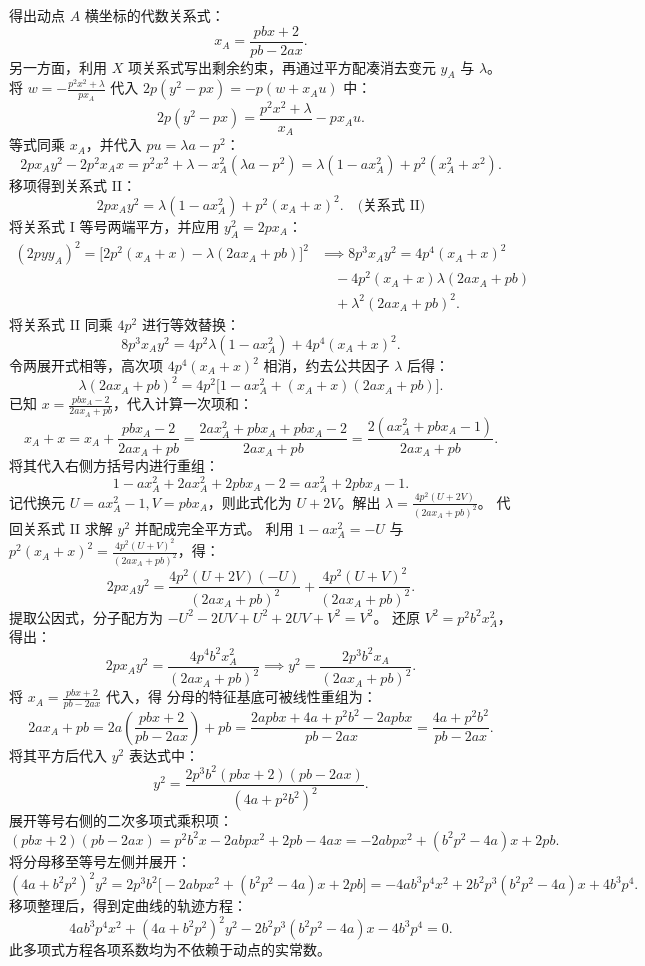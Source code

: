 \begin{solution}
得出动点 $A$ 横坐标的代数关系式：
\[ x_A = \frac{pbx + 2}{pb - 2ax}. \]
另一方面，利用 $X$ 项关系式写出剩余约束，再通过平方配凑消去变元 $y_A$ 与 $\lambda$。
将 $w = -\frac{p^2 x^2 + \lambda}{px_A}$ 代入 $2p(y^2 - px) = -p(w + x_A u)$ 中：
\[ 2p(y^2 - px) = \frac{p^2 x^2 + \lambda}{x_A} - px_A u. \]
等式同乘 $x_A$，并代入 $pu = \lambda a - p^2$：
\[ 2px_A y^2 - 2p^2 x_A x = p^2 x^2 + \lambda - x_A^2 (\lambda a - p^2) = \lambda(1 - ax_A^2) + p^2(x_A^2 + x^2). \]
移项得到关系式 II：
\[ 2px_A y^2 = \lambda(1 - ax_A^2) + p^2(x_A + x)^2. \quad \text{(关系式 II)} \]
将关系式 I 等号两端平方，并应用 $y_A^2 = 2px_A$：
\[
\begin{aligned}
(2py y_A)^2 = \big[ 2p^2(x_A + x) - \lambda(2ax_A + pb) \big]^2
&\implies 8p^3 x_A y^2 = 4p^4(x_A + x)^2 \\
&\quad - 4p^2(x_A + x)\lambda(2ax_A + pb) \\
&\quad + \lambda^2(2ax_A + pb)^2.
\end{aligned}
\]
将关系式 II 同乘 $4p^2$ 进行等效替换：
\[ 8p^3 x_A y^2 = 4p^2 \lambda(1 - ax_A^2) + 4p^4(x_A + x)^2. \]
令两展开式相等，高次项 $4p^4(x_A + x)^2$ 相消，约去公共因子 $\lambda$ 后得：
\[ \lambda(2ax_A + pb)^2 = 4p^2 \big[ 1 - ax_A^2 + (x_A + x)(2ax_A + pb) \big]. \]
已知 $x = \frac{pbx_A - 2}{2ax_A + pb}$，代入计算一次项和：
\[ x_A + x = x_A + \frac{pbx_A - 2}{2ax_A + pb} = \frac{2ax_A^2 + pbx_A + pbx_A - 2}{2ax_A + pb} = \frac{2(ax_A^2 + pbx_A - 1)}{2ax_A + pb}. \]
将其代入右侧方括号内进行重组：
\[ 1 - ax_A^2 + 2ax_A^2 + 2pbx_A - 2 = ax_A^2 + 2pbx_A - 1. \]
记代换元 $U = ax_A^2 - 1, V = pbx_A$，则此式化为 $U + 2V$。解出 $\lambda = \frac{4p^2(U + 2V)}{(2ax_A + pb)^2}$。
代回关系式 II 求解 $y^2$ 并配成完全平方式。
利用 $1 - ax_A^2 = -U$ 与 $p^2(x_A + x)^2 = \frac{4p^2(U + V)^2}{(2ax_A + pb)^2}$，得：
\[ 2px_A y^2 = \frac{4p^2(U + 2V)(-U)}{(2ax_A + pb)^2} + \frac{4p^2(U + V)^2}{(2ax_A + pb)^2}. \]
提取公因式，分子配方为 $-U^2 - 2UV + U^2 + 2UV + V^2 = V^2$。
还原 $V^2 = p^2 b^2 x_A^2$，得出：
\[ 2px_A y^2 = \frac{4p^4 b^2 x_A^2}{(2ax_A + pb)^2} \implies y^2 = \frac{2p^3 b^2 x_A}{(2ax_A + pb)^2}. \]
将 $x_A = \frac{pbx + 2}{pb - 2ax}$ 代入，得
分母的特征基底可被线性重组为：
\[ 2ax_A + pb = 2a\left(\frac{pbx + 2}{pb - 2ax}\right) + pb = \frac{2apbx + 4a + p^2 b^2 - 2apbx}{pb - 2ax} = \frac{4a + p^2 b^2}{pb - 2ax}. \]
将其平方后代入 $y^2$ 表达式中：
\[ y^2 = \frac{2p^3 b^2(pbx + 2)(pb - 2ax)}{(4a + p^2 b^2)^2}. \]
展开等号右侧的二次多项式乘积项：
\[ (pbx + 2)(pb - 2ax) = p^2 b^2 x - 2abpx^2 + 2pb - 4ax = -2abpx^2 + (b^2 p^2 - 4a)x + 2pb. \]
将分母移至等号左侧并展开：
\[ (4a + b^2 p^2)^2 y^2 = 2p^3 b^2 \big[ -2abpx^2 + (b^2 p^2 - 4a)x + 2pb \big] = -4ab^3 p^4 x^2 + 2b^2 p^3(b^2 p^2 - 4a)x + 4b^3 p^4. \]
移项整理后，得到定曲线的轨迹方程：
\[ 4ab^3 p^4 x^2 + (4a + b^2 p^2)^2 y^2 - 2b^2 p^3(b^2 p^2 - 4a)x - 4b^3 p^4 = 0. \]
此多项式方程各项系数均为不依赖于动点的实常数。
\end{solution}



